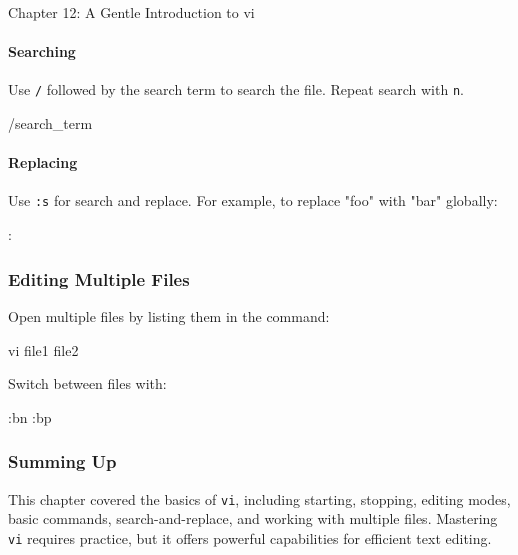 \begin{notes}{Chapter 12: A Gentle Introduction to vi}
    \paragraph*{Searching}

    Use \texttt{/} followed by the search term to search the file. Repeat search with \texttt{n}.

    \begin{highlight}
    \begin{code}[Pseudo]
    /search_term
    \end{code}
    \end{highlight}

    \paragraph*{Replacing}

    Use \texttt{:s} for search and replace. For example, to replace "foo" with "bar" globally:
    \begin{highlight}
    \begin{code}[Pseudo]
    :%
    \end{code}
    \end{highlight}

    \subsubsection*{Editing Multiple Files}

    Open multiple files by listing them in the command:
    \begin{highlight}
    \begin{code}[Pseudo]
    vi file1 file2
    \end{code}
    \end{highlight}

    Switch between files with:
    \begin{highlight}
    \begin{code}[Pseudo]
    :bn
    :bp
    \end{code}
    \end{highlight}

    \subsubsection*{Summing Up}

    This chapter covered the basics of \texttt{vi}, including starting, stopping, editing modes, basic commands, search-and-replace, and working with multiple files. Mastering \texttt{vi} requires 
    practice, but it offers powerful capabilities for efficient text editing.


\end{notes}
